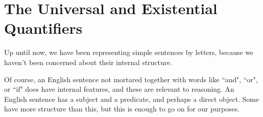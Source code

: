 \documentclass[12pt]{article}
\begin{document}
\begin{comment}
1& T& T & T & T & T & T & F & F\\ \hline
2& T& T & T & F & T & F & T & F\\ \hline
3& T& T & F& T & F & T & T & F\\ \hline
4& T& T & F & F & F& F & T & F\\ \hline
5& T& F& T & T & T & T & F & T\\ \hline
6& T& F & T & F & T & T & T & T\\ \hline
7& T& F & F & T & F & T & T & T\\ \hline
8& T& F & F & F & F& T & T & T\\ \hline
9& F& T & T & T & T & T & F & T\\ \hline
10& F& T & T & F & T & F & T & T\\ \hline
11& F& T & F & T & T & T & T & T\\ \hline
12& F& T & F & F & T & F & T & T\\ \hline
13& F& F & T & T & T & T & F & T\\ \hline
14& F& F & T & F & T & T & T & T\\ \hline
15& F& F & F & T & T & T & T & T\\ \hline
16& F& F & F & F & T & T & T & T\\ \hline

\end{array}$$

Lines 6,11,14,15,16 are the lines in which all the premises are true.  In each of these lines the conclusion is also true, so the argument is valid.

\end{enumerate}

\newpage

\end{comment}

\section{The Universal and Existential Quantifiers}

Up until now, we have been representing simple sentences by letters, because we haven't been concerned about their internal structure.

Of course, an English sentence not mortared together with words like ``and", ``or", or ``if" does have internal features, and these are relevant to reasoning.  An English sentence has a subject and a predicate, and perhaps a direct object.  Some have more structure than this, but this is enough to go on for our purposes.
\end{document}
